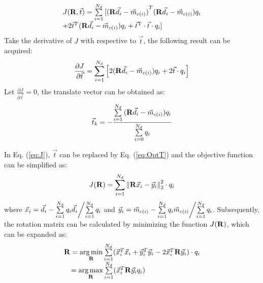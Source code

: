 \documentclass[review]{elsarticle}
\begin{document}
\begin{equation}
\begin{array}{l}
 J({\bf{R}},\vec t) = \sum\limits_{i = 1}^{{N_d}} {[{{({\bf{R}}{{\vec d}_i} - {{\vec m }_{c(i)}})}^T}({\bf{R}}{{\vec d}_i} - {{\vec m }_{c(i)}}){q_i}}  \\
  + 2{{\vec t}^T}({\bf{R}}{{\vec d}_i} - {{\vec m }_{c(i)}}) {q_i} +  {{\vec t}^{\rm{T}}} \cdot {\vec t} \cdot {q_i}] \\
 \end{array}
 \label{eq:J}
\end{equation}
Take the derivative of $J$ with respective to $\vec t$, the following result can be acquired:
\begin{equation}
\frac{{\partial J}}{{\partial {\vec t}}} = \sum\limits_{i = 1}^{N_d} {\left[ {2({\bf{R}}{{\vec d}_i} - {{\vec m }_{c(i)}}){q_i} + 2\vec t \cdot {q_i}} \right]}
\label{eq:Jt}
\end{equation}
Let $\frac{{\partial J}}{{\partial {\vec t}}}=0$, the translate vector can be obtained as:
\begin{equation}
{\vec t}_k =  - \frac{{\sum\limits_{i = 1}^{N_d} {({\bf{R}}{{\vec d}_i} - {{\vec m }_{c(i)}}){q_i}} }}{{\sum\limits_{i = 0}^{N_d} {{q_i}} }}
\label{eq:OptT}
\end{equation}

In Eq. (\ref{eq:J}), $\vec t$ can be replaced by Eq. (\ref{eq:OptT}) and the objective function can be simplified as:
\begin{equation}
J({\bf{R}}) = \sum\limits_{i = 1}^{{N_d}} {\left\| {{\bf{R}}{{\vec x}_i} - {{\vec y}_i}} \right\|_2^2}  \cdot {q_i}
\end{equation}
where ${\vec x_i} = {\vec d_i} - {{\sum\limits_{i = 1}^{{N_d}} {{q_i}} {{\vec d}_i}} \mathord{\left/
 {\vphantom {{\sum\limits_{i = 1}^{{N_d}} {{q_i}} {{\vec d}_i}} {\sum\limits_{i = 1}^{{N_d}} {{q_i}} }}} \right.
 \kern-\nulldelimiterspace} {\sum\limits_{i = 1}^{{N_d}} {{q_i}} }}$ and ${\vec y_i} = {\vec m_{c(i)}} - {{\sum\limits_{i = 1}^{{N_d}} {{q_i}} {{\vec m}_{c(i)}}} \mathord{\left/
 {\vphantom {{\sum\limits_{i = 1}^{{N_d}} {{q_i}} {{\vec m}_{c(i)}}} {\sum\limits_{i = 1}^{{N_d}} {{q_i}} }}} \right.
 \kern-\nulldelimiterspace} {\sum\limits_{i = 1}^{{N_d}} {{q_i}} }}$. Subsequently, the rotation matrix can be calculated by minimizing the function $J(\bf{R})$, which can be expanded as:
 \begin{equation}
\begin{array}{l}
{\bf{R}}= \mathop {\arg \min }\limits_{\bf{R}}  {\sum\limits_{i = 1}^{{N_d}} ({{\vec x}_i^T{{\vec x}_i} + {\vec y}_i^T{{\vec y}_i} - 2{\vec x}_i^T{\bf{R}}{{\vec y}_i}} })\cdot {q_i} \\
\quad  = \mathop {{\mathop{\arg \max}\nolimits} }\limits_{\bf{R}} \sum\limits_{i = 1}^{{N_d}} ({{\vec x}_ i^T{\bf{R}}{{\vec y}_i}}{q_i})
\end{array}
\label{eq:Arun}
 \end{equation}
\end{document}
